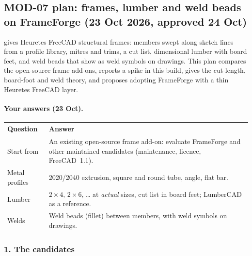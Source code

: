 \subsection{MOD-07 plan: frames, lumber and weld beads on FrameForge (23 Oct 2026, approved 24 Oct)}\label{sec:mod07-plan}

 gives Heuretes FreeCAD structural frames: members swept along sketch lines from a profile library, mitres and
trims, a cut list, dimensional lumber with board feet, and weld beads that show as weld symbols on drawings. This plan
compares the open-source frame add-ons, reports a spike in this build, gives the cut-length, board-foot and weld theory,
and proposes adopting FrameForge with a thin Heuretes FreeCAD layer.

\paragraph{Your answers (23 Oct).}
\begin{center}
\small
\begin{tabularx}{\linewidth}{@{}lX@{}}
\toprule
Question & Answer\\
\midrule
Start from & An existing open-source frame add-on: evaluate FrameForge and other maintained candidates (maintenance,
  licence, FreeCAD~1.1).\\
Metal profiles & 2020/2040 extrusion, square and round tube, angle, flat bar.\\
Lumber & $2\times4$, $2\times6$, \ldots{} at \emph{actual} sizes, cut list in board feet; LumberCAD as a reference.\\
Welds & Weld beads (fillet) between members, with weld symbols on drawings.\\
\bottomrule
\end{tabularx}
\end{center}

\subsubsection*{1. The candidates}

